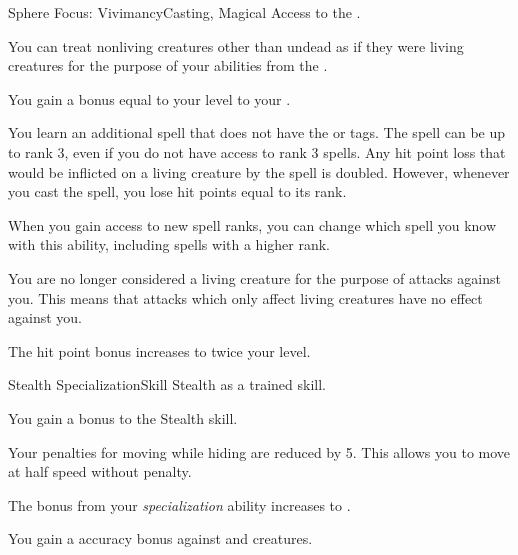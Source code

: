   \begin{magicalfeat}{Sphere Focus: Vivimancy}{Casting, Magical}
    \featpre Access to the  .

     You can treat nonliving creatures other than undead as if they were living creatures for the purpose of your abilities from the  .

     You gain a bonus equal to your level to your .

     You learn an additional spell that does not have the  or  tags.
    The spell can be up to rank 3, even if you do not have access to rank 3 spells.
    Any hit point loss that would be inflicted on a living creature by the spell is doubled.
    However, whenever you cast the spell, you lose hit points equal to its rank.

    When you gain access to new spell ranks, you can change which spell you know with this ability, including spells with a higher rank.

     You are no longer considered a living creature for the purpose of attacks against you.
    This means that attacks which only affect living creatures have no effect against you.

     The hit point bonus increases to twice your level.
  \end{magicalfeat}

  \begin{feat}{Stealth Specialization}{Skill}
    \featpre Stealth as a trained skill.

     You gain a  bonus to the Stealth skill.

     Your penalties for moving while hiding are reduced by 5.
    This allows you to move at half speed without penalty.

     The bonus from your \textit{specialization} ability increases to .

     You gain a  accuracy bonus against \unaware and \partiallyunaware creatures.
  \end{feat}

